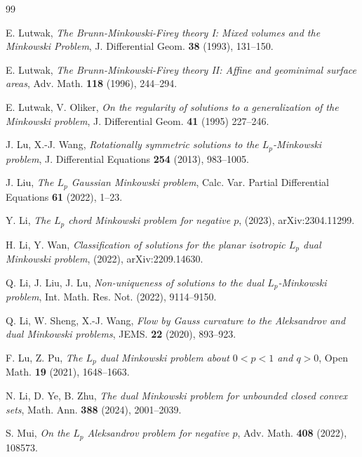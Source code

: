 \documentclass[12pt, reqno]{amsart}
\theoremstyle{definition}
\theoremstyle{remark}
\numberwithin{equation}{section}
\newcommand{\Lp}{L_{p}}
\begin{document}
\begin{thebibliography}{99}
			
			E. Lutwak,
			\emph{The Brunn-Minkowski-Firey theory I: Mixed volumes and the Minkowski Problem},
			J. Differential Geom. \textbf{38} (1993), 131--150.
			
			
			E. Lutwak,
			\emph{The Brunn-Minkowski-Firey theory II: Affine and geominimal surface areas},
			Adv. Math. \textbf{118} (1996), 244--294.
			
			
			E. Lutwak, V. Oliker, \emph{On the regularity of solutions to a generalization of the Minkowski problem},
				J. Differential Geom. \textbf{41} (1995) 227--246.
			
			
			
			J. Lu, X.-J. Wang, \emph{Rotationally symmetric solutions to the $\Lp$-Minkowski problem}, J. Differential
			Equations \textbf{254} (2013), 983--1005.
			
			
			
			
			J. Liu,
			\emph{The $L_{p}$ Gaussian Minkowski problem},
			Calc. Var. Partial Differential Equations \textbf{61} (2022), 1--23.
			
			Y. Li, \emph{The $\Lp$ chord Minkowski problem for negative $p$}, (2023), arXiv:2304.11299.
			
			
			H. Li, Y. Wan, \emph{Classification of solutions for the planar isotropic $\Lp$ dual Minkowski problem}, (2022),
			arXiv:2209.14630.
			
			 Q. Li, J. Liu, J. Lu, \emph{Non-uniqueness of solutions to the dual $\Lp$-Minkowski problem}, Int. Math.
			 Res. Not. (2022),
			9114--9150.
			
			
			
			
			Q. Li, W. Sheng, X.-J. Wang, \emph{ Flow by Gauss curvature to the Aleksandrov and dual Minkowski
			problems}, JEMS. \textbf{22} (2020), 893--923.
			
			F. Lu, Z. Pu, \emph{The $\Lp$ dual Minkowski problem about $0<p<1$ and $q>0$}, Open Math. \textbf{19} (2021),
			1648--1663.
			
			N. Li, D. Ye, B. Zhu, \emph{The dual Minkowski problem for unbounded closed convex sets}, Math. Ann. \textbf{388}
			(2024), 2001--2039.
			
			S. Mui, \emph{On the $\Lp$ Aleksandrov problem for negative $p$}, Adv. Math. \textbf{408} (2022),  108573.
			

\end{thebibliography}
\end{document}
